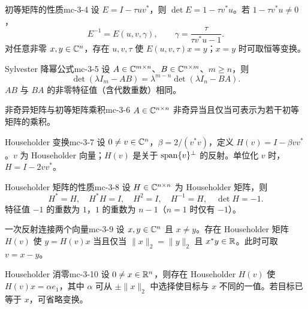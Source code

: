 \begin{theorem}{初等矩阵的性质}{mc-3-4}
设 $E=I-\tau uv^*$，则 $\det E=1-\tau v^*u$。若 $1-\tau v^*u\ne0$，
\[E^{-1}=E(u,v,\gamma),\qquad\gamma=\frac{\tau}{\tau v^*u-1}.\]
对任意非零 $x,y\in\mathbb{C}^n$，存在 $u,v,\tau$ 使 $E(u,v,\tau)x=y$；$x=y$ 时可取恒等变换。
\end{theorem}

\begin{proposition}{Sylvester 降幂公式}{mc-3-5}
设 $A\in\mathbb{C}^{m\times n}$、$B\in\mathbb{C}^{n\times m}$、$m\geq n$，则
\[\det(\lambda I_m-AB)=\lambda^{m-n}\det(\lambda I_n-BA).\]
$AB$ 与 $BA$ 的非零特征值（含代数重数）相同。
\end{proposition}

\begin{theorem}{非奇异矩阵与初等矩阵乘积}{mc-3-6}
$A\in\mathbb{C}^{n\times n}$ 非奇异当且仅当可表示为若干初等矩阵的乘积。
\end{theorem}

\begin{definition}{Householder 变换}{mc-3-7}
设 $0\ne v\in\mathbb{C}^n$，$\beta=2/(v^*v)$，定义 $H(v)=I-\beta vv^*$。$v$ 为 Householder 向量；$H(v)$ 是关于 $\operatorname{span}\{v\}^\perp$ 的反射。单位化 $v$ 时，$H=I-2vv^*$。
\end{definition}

\begin{theorem}{Householder 矩阵的性质}{mc-3-8}
设 $H\in\mathbb{C}^{n\times n}$ 为 Householder 矩阵，则
\[H^*=H,\quad H^*H=I,\quad H^2=I,\quad H^{-1}=H,\quad\det H=-1.\]
特征值 $-1$ 的重数为 $1$，$1$ 的重数为 $n-1$（$n=1$ 时仅有 $-1$）。
\end{theorem}

\begin{lemma}{一次反射连接两个向量}{mc-3-9}
设 $x,y\in\mathbb{C}^n$ 且 $x\ne y$。存在 Householder 矩阵 $H(v)$ 使 $y=H(v)x$ 当且仅当 $\|x\|_2=\|y\|_2$ 且 $x^*y\in\mathbb{R}$。此时可取 $v=x-y$。
\end{lemma}

\begin{theorem}{Householder 消零}{mc-3-10}
设 $0\ne x\in\mathbb{R}^n$，则存在 Householder $H(v)$ 使 $H(v)x=\alpha e_1$，其中 $\alpha$ 可从 $\pm\|x\|_2$ 中选择使目标与 $x$ 不同的一值。若目标已等于 $x$，可省略变换。
\end{theorem}

